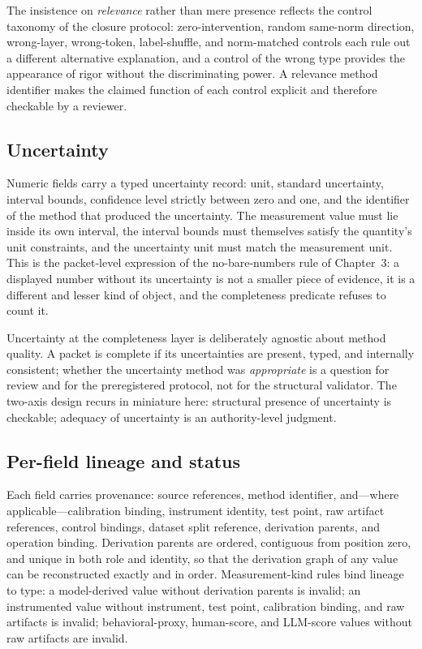 The insistence on \emph{relevance} rather than mere presence reflects the control taxonomy of the closure protocol: zero-intervention, random same-norm direction, wrong-layer, wrong-token, label-shuffle, and norm-matched controls each rule out a different alternative explanation, and a control of the wrong type provides the appearance of rigor without the discriminating power. A relevance method identifier makes the claimed function of each control explicit and therefore checkable by a reviewer.

\subsection{Uncertainty}\label{elig:sec:uncertainty}

Numeric fields carry a typed uncertainty record: unit, standard uncertainty, interval bounds, confidence level strictly between zero and one, and the identifier of the method that produced the uncertainty. The measurement value must lie inside its own interval, the interval bounds must themselves satisfy the quantity's unit constraints, and the uncertainty unit must match the measurement unit. This is the packet-level expression of the no-bare-numbers rule of Chapter~3: a displayed number without its uncertainty is not a smaller piece of evidence, it is a different and lesser kind of object, and the completeness predicate refuses to count it.

Uncertainty at the completeness layer is deliberately agnostic about method quality. A packet is complete if its uncertainties are present, typed, and internally consistent; whether the uncertainty method was \emph{appropriate} is a question for review and for the preregistered protocol, not for the structural validator. The two-axis design recurs in miniature here: structural presence of uncertainty is checkable; adequacy of uncertainty is an authority-level judgment.

\subsection{Per-field lineage and status}\label{elig:sec:lineage}

Each field carries provenance: source references, method identifier, and---where applicable---calibration binding, instrument identity, test point, raw artifact references, control bindings, dataset split reference, derivation parents, and operation binding. Derivation parents are ordered, contiguous from position zero, and unique in both role and identity, so that the derivation graph of any value can be reconstructed exactly and in order. Measurement-kind rules bind lineage to type: a model-derived value without derivation parents is invalid; an instrumented value without instrument, test point, calibration binding, and raw artifacts is invalid; behavioral-proxy, human-score, and LLM-score values without raw artifacts are invalid.

